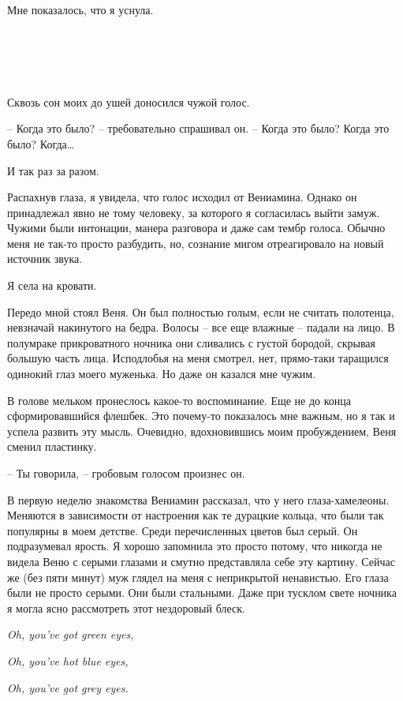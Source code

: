 \documentclass[
]{book}
\begin{document}
Мне показалось, что я уснула.

\hypertarget{chapter-51}{%
\chapter{~}\label{chapter-51}}

Сквозь сон моих до ушей доносился чужой голос.

-- Когда это было? -- требовательно спрашивал он. -- Когда это было? Когда это было? Когда\ldots{}

И так раз за разом.

Распахнув глаза, я увидела, что голос исходил от Вениамина. Однако он принадлежал явно не тому человеку, за которого я согласилась выйти замуж. Чужими были интонации, манера разговора и даже сам тембр голоса. Обычно меня не так-то просто разбудить, но, сознание мигом отреагировало на новый источник звука.

Я села на кровати.

Передо мной стоял Веня. Он был полностью голым, если не считать полотенца, невзначай накинутого на бедра. Волосы -- все еще влажные -- падали на лицо. В полумраке прикроватного ночника они сливались с густой бородой, скрывая большую часть лица. Исподлобья на меня смотрел, нет, прямо-таки таращился одинокий глаз моего муженька. Но даже он казался мне чужим.

В голове мельком пронеслось какое-то воспоминание. Еще не до конца сформировавшийся флешбек. Это почему-то показалось мне важным, но я так и успела развить эту мысль. Очевидно, вдохновившись моим пробуждением, Веня сменил пластинку.

-- Ты говорила, -- гробовым голосом произнес он.

В первую неделю знакомства Вениамин рассказал, что у него глаза-хамелеоны. Меняются в зависимости от настроения как те дурацкие кольца, что были так популярны в моем детстве. Среди перечисленных цветов был серый. Он подразумевал ярость. Я хорошо запомнила это просто потому, что никогда не видела Веню с серыми глазами и смутно представляла себе эту картину. Сейчас же (без пяти минут) муж глядел на меня с неприкрытой ненавистью. Его глаза были не просто серыми. Они были стальными. Даже при тусклом свете ночника я могла ясно рассмотреть этот нездоровый блеск.

\emph{Oh, you've got green eyes,}

\emph{Oh, you've hot blue eyes,}

\emph{Oh, you've got grey eyes.}
\end{document}
